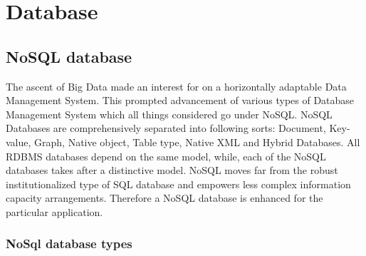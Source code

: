 \section{Database}

\subsection{NoSQL database}
The ascent of Big Data made an interest for on a horizontally adaptable Data Management System. This prompted advancement of various types of Database Management System which all things considered go under NoSQL. NoSQL Databases are comprehensively separated into following sorts: Document, Key-value, Graph, Native object, Table type, Native XML and Hybrid Databases. All RDBMS databases depend on the same model, while, each of the NoSQL databases takes after a distinctive model. NoSQL moves far from the robust institutionalized type of SQL database and empowers less complex information capacity arrangements. Therefore a NoSQL database is enhanced for the particular application.\cite{noSql}

\subsubsection{NoSql database types}

